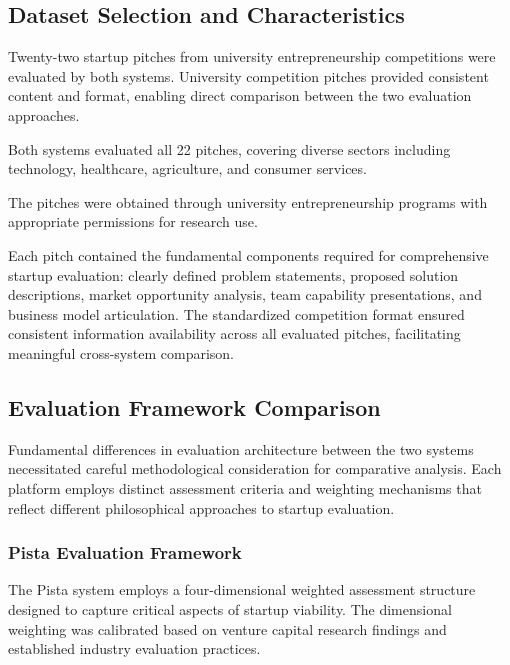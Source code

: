 \subsection{Dataset Selection and Characteristics}
\label{subsec:dataset}

Twenty-two startup pitches from university entrepreneurship competitions were evaluated by both systems. University competition pitches provided consistent content and format, enabling direct comparison between the two evaluation approaches.

Both systems evaluated all 22 pitches, covering diverse sectors including technology, healthcare, agriculture, and consumer services.

The pitches were obtained through university entrepreneurship programs with appropriate permissions for research use.

Each pitch contained the fundamental components required for comprehensive startup evaluation: clearly defined problem statements, proposed solution descriptions, market opportunity analysis, team capability presentations, and business model articulation. The standardized competition format ensured consistent information availability across all evaluated pitches, facilitating meaningful cross-system comparison.

\subsection{Evaluation Framework Comparison}
\label{subsec:frameworks}

Fundamental differences in evaluation architecture between the two systems necessitated careful methodological consideration for comparative analysis. Each platform employs distinct assessment criteria and weighting mechanisms that reflect different philosophical approaches to startup evaluation.

\subsubsection{Pista Evaluation Framework}

The Pista system employs a four-dimensional weighted assessment structure designed to capture critical aspects of startup viability. The dimensional weighting was calibrated based on venture capital research findings and established industry evaluation practices.

